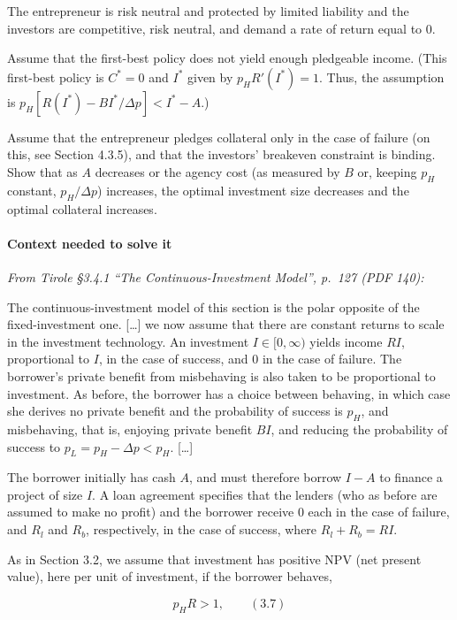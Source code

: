 \documentclass[11pt,a4paper]{article}
\begin{document}
The entrepreneur is risk neutral and protected by limited liability and the investors are
competitive, risk neutral, and demand a rate of return equal to 0.

Assume that the first-best policy does not yield enough pledgeable income. (This first-best policy
is \(C^* = 0\) and \(I^*\) given by \(p_H R'(I^*) = 1\). Thus, the assumption is
\(p_H[R(I^*) - BI^*/\Delta p] < I^* - A\).)

Assume that the entrepreneur pledges collateral only in the case of failure (on this, see Section
4.3.5), and that the investors' breakeven constraint is binding. Show that as \(A\) decreases or the
agency cost (as measured by \(B\) or, keeping \(p_H\) constant, \(p_H/\Delta p\)) increases, the
optimal investment size decreases and the optimal collateral increases.

\paragraph{Context needed to solve it}

\emph{From Tirole §3.4.1 ``The Continuous-Investment Model'', p.~127 (PDF 140):}

The continuous-investment model of this section is the polar opposite of the fixed-investment one.
{[}\ldots{]} we now assume that there are constant returns to scale in the investment technology. An
investment \(I \in [0, \infty)\) yields income \(RI\), proportional to \(I\), in the case of
success, and 0 in the case of failure. The borrower's private benefit from misbehaving is also taken
to be proportional to investment. As before, the borrower has a choice between behaving, in which
case she derives no private benefit and the probability of success is \(p_H\), and misbehaving, that
is, enjoying private benefit \(BI\), and reducing the probability of success to
\(p_L = p_H - \Delta p < p_H\). {[}\ldots{]}

The borrower initially has cash \(A\), and must therefore borrow \(I - A\) to finance a project of
size \(I\). A loan agreement specifies that the lenders (who as before are assumed to make no
profit) and the borrower receive 0 each in the case of failure, and \(R_l\) and \(R_b\),
respectively, in the case of success, where \(R_l + R_b = RI\).

As in Section 3.2, we assume that investment has positive NPV (net present value), here per unit of
investment, if the borrower behaves,

\[p_H R > 1, \qquad (3.7)\]
\end{document}
